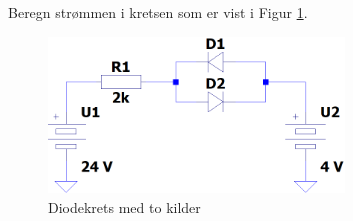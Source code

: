 \vspace{0.5cm} %

\begin{question}[name=Oppgave, topic=dioder]
Beregn strømmen i kretsen som er vist i Figur \ref{fig:2kilder}.
	\begin{figure}[H]
			\centering
			\includegraphics[width=0.7\textwidth]{diode/figurer/kretsM2kilder.png}
			\caption{Diodekrets med to kilder}
			\label{fig:2kilder}
		\end{figure}

\end{question}

